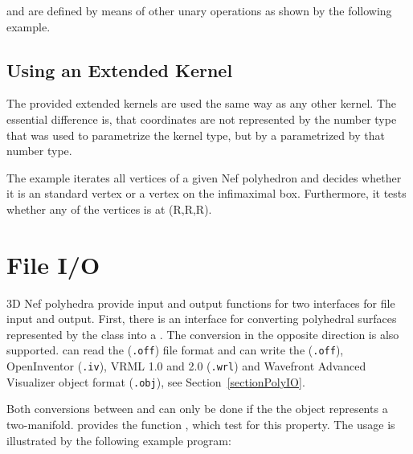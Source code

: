  and  are defined by means of other
unary operations as shown by the following example.



\subsection{Using an Extended Kernel}

The provided extended kernels are used the same way as any other \cgal kernel.
The essential difference is, that coordinates are not represented by the number
type that was used to parametrize the kernel type, but by a 
parametrized by that number type.

The example iterates all vertices of a given Nef polyhedron and decides whether
it is an standard vertex or a vertex on the infimaximal box. Furthermore, it 
tests whether any of the vertices is at (R,R,R). 


\section{File I/O}
\label{sectionNef_3IO}

3D Nef polyhedra provide input and output functions for two interfaces for file
input and output. First, there is an interface for converting polyhedral surfaces
represented by the \cgal class  into a . The 
conversion in the opposite direction is also supported.  can read
the ({\tt .off}) file format and can write the ({\tt .off}),
OpenInventor ({\tt .iv}), VRML 1.0 and 2.0 ({\tt .wrl}) and Wavefront Advanced
Visualizer object format ({\tt .obj}), see Section~\ref{sectionPolyIO}.
 
Both conversions between  and  can only 
be done if the the object represents a two-manifold. 
provides the function , which test for this property. The
usage is illustrated by the following example program:


